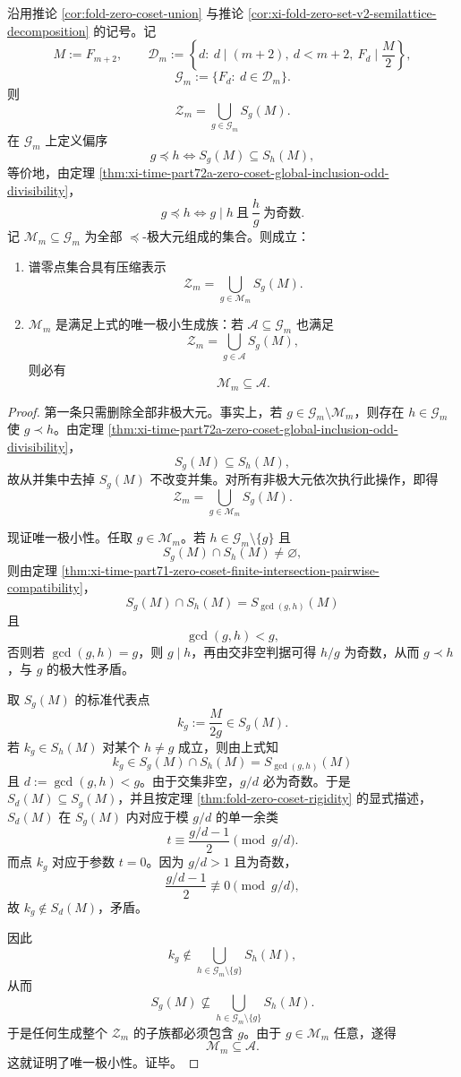 \begin{theorem}[谱零点集合在奇商偏序下的唯一极小生成族]\label{thm:xi-time-part72a-zero-spectrum-maximal-odd-divisibility-compression}
沿用推论 \ref{cor:fold-zero-coset-union} 与推论 \ref{cor:xi-fold-zero-set-v2-semilattice-decomposition} 的记号。记
\[
M:=F_{m+2},
\qquad
\mathcal D_m:=
\left\{
d:\ d\mid (m+2),\ d<m+2,\ F_d\mid \frac{M}{2}
\right\},
\]
\[
\mathcal G_m:=\{F_d:\ d\in \mathcal D_m\}.
\]
则
\[
\mathcal Z_m=\bigcup_{g\in \mathcal G_m}S_g(M).
\]
在 \(\mathcal G_m\) 上定义偏序
\[
g\preceq h
\iff
S_g(M)\subseteq S_h(M),
\]
等价地，由定理 \ref{thm:xi-time-part72a-zero-coset-global-inclusion-odd-divisibility}，
\[
g\preceq h
\iff
g\mid h\ \text{且}\ \frac{h}{g}\ \text{为奇数}.
\]
记 \(\mathcal M_m\subseteq \mathcal G_m\) 为全部 \(\preceq\)-极大元组成的集合。则成立：
\begin{enumerate}
  \item 谱零点集合具有压缩表示
  \[
  \mathcal Z_m=\bigcup_{g\in \mathcal M_m}S_g(M).
  \]
  \item \(\mathcal M_m\) 是满足上式的唯一极小生成族：若 \(\mathcal A\subseteq \mathcal G_m\) 也满足
  \[
  \mathcal Z_m=\bigcup_{g\in \mathcal A}S_g(M),
  \]
  则必有
  \[
  \mathcal M_m\subseteq \mathcal A.
  \]
\end{enumerate}
\end{theorem}
\begin{proof}
第一条只需删除全部非极大元。事实上，若 \(g\in \mathcal G_m\setminus \mathcal M_m\)，则存在 \(h\in \mathcal G_m\) 使 \(g\prec h\)。由定理 \ref{thm:xi-time-part72a-zero-coset-global-inclusion-odd-divisibility}，
\[
S_g(M)\subseteq S_h(M),
\]
故从并集中去掉 \(S_g(M)\) 不改变并集。对所有非极大元依次执行此操作，即得
\[
\mathcal Z_m=\bigcup_{g\in \mathcal M_m}S_g(M).
\]

现证唯一极小性。任取 \(g\in \mathcal M_m\)。若 \(h\in \mathcal G_m\setminus\{g\}\) 且
\[
S_g(M)\cap S_h(M)\neq \varnothing,
\]
则由定理 \ref{thm:xi-time-part71-zero-coset-finite-intersection-pairwise-compatibility}，
\[
S_g(M)\cap S_h(M)=S_{\gcd(g,h)}(M)
\]
且
\[
\gcd(g,h)<g,
\]
否则若 \(\gcd(g,h)=g\)，则 \(g\mid h\)，再由交非空判据可得 \(h/g\) 为奇数，从而 \(g\prec h\)，与 \(g\) 的极大性矛盾。

取 \(S_g(M)\) 的标准代表点
\[
k_g:=\frac{M}{2g}\in S_g(M).
\]
若 \(k_g\in S_h(M)\) 对某个 \(h\neq g\) 成立，则由上式知
\[
k_g\in S_g(M)\cap S_h(M)=S_{\gcd(g,h)}(M)
\]
且 \(d:=\gcd(g,h)<g\)。由于交集非空，\(g/d\) 必为奇数。于是 \(S_d(M)\subseteq S_g(M)\)，并且按定理 \ref{thm:fold-zero-coset-rigidity} 的显式描述，\(S_d(M)\) 在 \(S_g(M)\) 内对应于模 \(g/d\) 的单一余类
\[
t\equiv \frac{g/d-1}{2}\pmod{g/d}.
\]
而点 \(k_g\) 对应于参数 \(t=0\)。因为 \(g/d>1\) 且为奇数，
\[
\frac{g/d-1}{2}\not\equiv 0\pmod{g/d},
\]
故 \(k_g\notin S_d(M)\)，矛盾。

因此
\[
k_g\notin \bigcup_{h\in \mathcal G_m\setminus\{g\}}S_h(M),
\]
从而
\[
S_g(M)\nsubseteq \bigcup_{h\in \mathcal G_m\setminus\{g\}}S_h(M).
\]
于是任何生成整个 \(\mathcal Z_m\) 的子族都必须包含 \(g\)。由于 \(g\in \mathcal M_m\) 任意，遂得
\[
\mathcal M_m\subseteq \mathcal A.
\]
这就证明了唯一极小性。证毕。
\end{proof}

